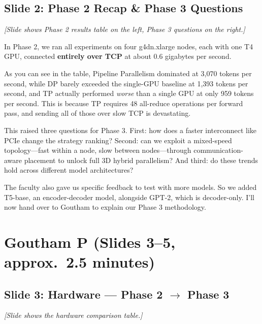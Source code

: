 \documentclass[11pt, a4paper]{article}
\begin{document}
\subsection{Slide 2: Phase 2 Recap \& Phase 3 Questions}
\textit{[Slide shows Phase 2 results table on the left, Phase 3 questions on the right.]}

In Phase 2, we ran all experiments on four g4dn.xlarge nodes, each with one T4 GPU, connected \textbf{entirely over TCP} at about 0.6 gigabytes per second.

As you can see in the table, Pipeline Parallelism dominated at 3,070 tokens per second, while DP barely exceeded the single-GPU baseline at 1,393 tokens per second, and TP actually performed \textit{worse} than a single GPU at only 959 tokens per second. This is because TP requires 48 all-reduce operations per forward pass, and sending all of those over slow TCP is devastating.

This raised three questions for Phase 3. First: how does a faster interconnect like PCIe change the strategy ranking? Second: can we exploit a mixed-speed topology---fast within a node, slow between nodes---through communication-aware placement to unlock full 3D hybrid parallelism? And third: do these trends hold across different model architectures?

The faculty also gave us specific feedback to test with more models. So we added T5-base, an encoder-decoder model, alongside GPT-2, which is decoder-only. I'll now hand over to Goutham to explain our Phase 3 methodology.

\section{Goutham P (Slides 3--5, approx.\ 2.5 minutes)}

\subsection{Slide 3: Hardware --- Phase 2 $\rightarrow$ Phase 3}
\textit{[Slide shows the hardware comparison table.]}
\end{document}
